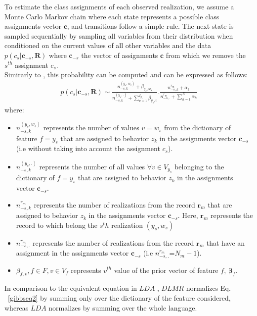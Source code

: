 To estimate the class assignments of each observed realization, we assume a Monte Carlo Markov chain \cite{montecarlo} where each state represents a possible class assignments vector $\mathbf{c}$, and transitions follow a simple rule. The next state is sampled sequentially by sampling all variables from their distribution when conditioned on the current values of all other variables and the data $p(c_{s}|\mathbf{c}_{-s},\mathbf{R})$ where $\mathbf{c}_{-s}$ the vector of assignments $\mathbf{c}$ from which we remove the $s^{th}$ assignment $c_{s}$.
\\Simirarly to \cite{gibbs}, this probability can be computed and can be expressed as follows:
\begin{equation}\label{gibbseq2}
\begin{split} 
p(c_{s}|\mathbf{c}_{-s},\mathbf{R})\sim \frac{n^{(y_{s},w_{s})}_{-s,k}+\beta _{y_{s},w_{s}}}{n^{(y_{s},.)}_{-s,k}+\sum_{v=1}^{I_{y_{s}}}\beta _{y_{s},v}}.\frac{n^{r_{m}}_{-s,k}+\alpha _{k}}{n^{r_{m}}_{-s,.}+\sum_{h=1}^{K}\alpha _{h}}
\end{split} 
\end{equation}
where:
\begin{itemize} 
	\item $n^{(y_{s},w_{s})}_{-s,k}$ represents the number of values $v=w_{s}$ from the dictionary of feature $f=y_{s}$ that are assigned to behavior $z_{k}$ in the assignments vector $\mathbf{c}_{-s}$ (i.e without taking into 			account the assignment $c_{s}$).
	\item $n^{(y_{s},.)}_{-s,k}$ represents the number of all values $\forall v \in V_{y_{s}}$ belonging to the dictionary of $f=y_{s}$ that are assigned to behavior $z_{k}$ in the assignments vector $\mathbf{c}_{-s}$.
	\item  $n^{r_{m}}_{-s,k}$ represents the number of realizations from the record $\mathbf{r}_{m}$ that are assigned to behavior $z_{k}$ in the assignments vector $\mathbf{c}_{-s}$. Here, $\mathbf{r}_{m}$ represents the 		record to which belong the $s^th$ realization $(y_{s},w_{s})$
	\item  $n^{r_{m}}_{-s,.}$ represents the number of realizations from the record $\mathbf{r}_{m}$ that have an assignment in the assignments vector $\mathbf{c}_{-s}$ (i.e $n^{r_{m}}_{-s,.}$=$N_{m}-1$).
	\item  $\beta _{f,v}, f\in F, v \in V_{f}$ represents $v^{th}$ value of the prior vector of feature $f$, $\boldsymbol{\beta }_{f}$.
\end{itemize}
In comparison to the equivalent equation in $LDA$ \cite{gibbs}, $DLMR$ normalizes Eq. ~\eqref{gibbseq2} by summing only over the dictionary of the feature considered, whereas $LDA$ normalizes by summing over the whole language.
